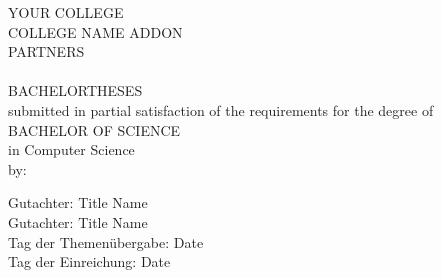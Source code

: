 \begin{titlepage}

	\begin{center}
	YOUR COLLEGE\\[0.6cm]
	COLLEGE NAME ADDON\\[2cm]
	
	PARTNERS\\[2cm]
	
	\newtitle\\[2cm]
	
	
	BACHELORTHESES\\[0.6cm]
	submitted in partial satisfaction of the requirements for the degree of\\[0.6cm]
	BACHELOR OF SCIENCE\\[0.6cm]
	in Computer Science\\[2cm]
	
	by:\\[0.6cm]
	\newauthor
	\end{center}

	\vfill
	
	Gutachter: Title Name\\
	Gutachter: Title Name\\[0.2cm]
	Tag der Themenübergabe: Date\\
	Tag der Einreichung: Date

\end{titlepage}
